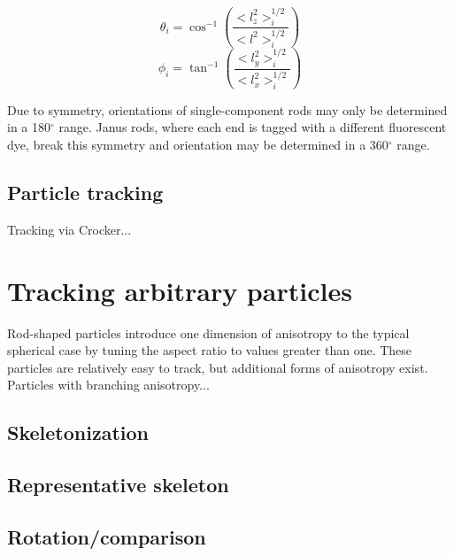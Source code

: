 \begin{equation}
\label{eq:theta}
\theta_i = \cos^{-1} \left(\frac{<l_z^2>_i^{1/2}}{<l^2>_i^{1/2}} \right)
\end{equation}
\begin{equation}
\label{eq:phi}
\phi_i = \tan^{-1} \left(\frac{<l_y^2>_i^{1/2}}{<l_x^2>_i^{1/2}} \right)
\end{equation}

Due to symmetry, orientations of single-component rods may only be determined in a 180$^\circ$ range.
Janus rods, where each end is tagged with a different fluorescent dye, break this symmetry and orientation
may be determined in a 360$^\circ$ range.


\subsection{Particle tracking}

Tracking via Crocker...

\section{Tracking arbitrary particles}

Rod-shaped particles introduce one dimension of anisotropy to the typical spherical case by tuning the
aspect ratio to values greater than one.  These particles are relatively easy to track, but additional 
forms of anisotropy exist.  Particles with branching anisotropy...

\subsection{Skeletonization}

\subsection{Representative skeleton}

\subsection{Rotation/comparison}


